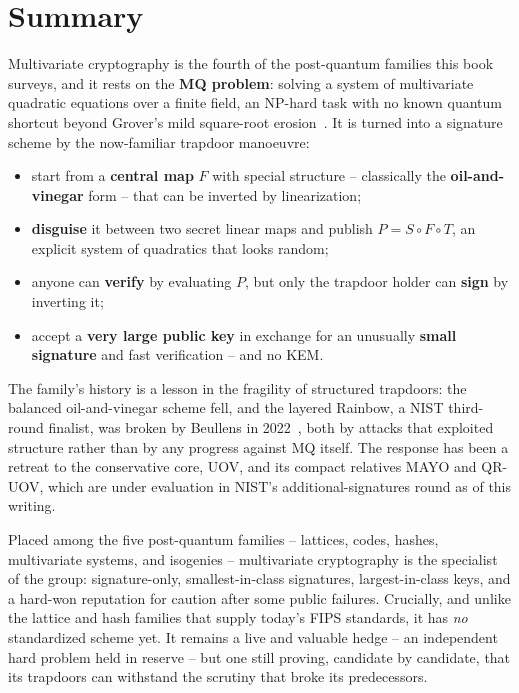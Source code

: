 \section{Summary}

Multivariate cryptography is the fourth of the post-quantum families this book surveys, and it rests on the \textbf{MQ problem}: solving a system of multivariate quadratic equations over a finite field, an NP-hard task with no known quantum shortcut beyond Grover's mild square-root erosion~\cite{ding2006}. It is turned into a signature scheme by the now-familiar trapdoor manoeuvre:

\begin{itemize}
  \item start from a \textbf{central map} $F$ with special structure -- classically the \textbf{oil-and-vinegar} form -- that can be inverted by linearization;
  \item \textbf{disguise} it between two secret linear maps and publish $P = S \circ F \circ T$, an explicit system of quadratics that looks random;
  \item anyone can \textbf{verify} by evaluating $P$, but only the trapdoor holder can \textbf{sign} by inverting it;
  \item accept a \textbf{very large public key} in exchange for an unusually \textbf{small signature} and fast verification -- and no KEM.
\end{itemize}

The family's history is a lesson in the fragility of structured trapdoors: the balanced oil-and-vinegar scheme fell, and the layered Rainbow, a NIST third-round finalist, was broken by Beullens in 2022~\cite{beullens2022}, both by attacks that exploited structure rather than by any progress against MQ itself. The response has been a retreat to the conservative core, UOV, and its compact relatives MAYO and QR-UOV, which are under evaluation in NIST's additional-signatures round as of this writing.

Placed among the five post-quantum families -- lattices, codes, hashes, multivariate systems, and isogenies -- multivariate cryptography is the specialist of the group: signature-only, smallest-in-class signatures, largest-in-class keys, and a hard-won reputation for caution after some public failures. Crucially, and unlike the lattice and hash families that supply today's FIPS standards, it has \emph{no} standardized scheme yet. It remains a live and valuable hedge -- an independent hard problem held in reserve -- but one still proving, candidate by candidate, that its trapdoors can withstand the scrutiny that broke its predecessors.

\printbibliography[heading=chapterrefs]
